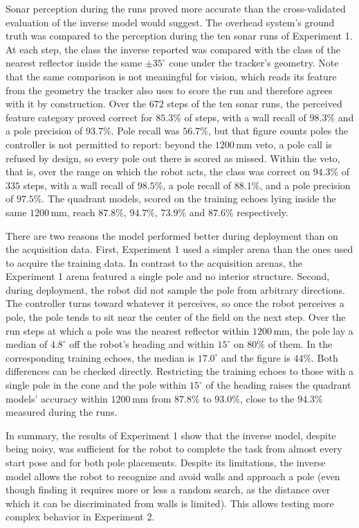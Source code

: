 \documentclass[11pt]{article}
\newcommand{\dgm}{^{\circ}}
\begin{document}
Sonar perception during the runs proved more accurate than the cross-validated evaluation of the inverse model would suggest. The overhead system's ground truth was compared to the perception during the ten sonar runs of Experiment 1. At each step, the class the inverse reported was compared with the class of the nearest reflector inside the same $\pm 35\dgm$ cone under the tracker's geometry. Note that the same comparison is not meaningful for vision, which reads its feature from the geometry the tracker also uses to score the run and therefore agrees with it by construction. Over the $672$ steps of the ten sonar runs, the perceived feature category proved correct for $85.3\%$ of steps, with a wall recall of $98.3\%$ and a pole precision of $93.7\%$. Pole recall was $56.7\%$, but that figure counts poles the controller is not permitted to report: beyond the $1200$\,mm veto, a pole call is refused by design, so every pole out there is scored as missed. Within the veto, that is, over the range on which the robot acts, the class was correct on $94.3\%$ of $335$ steps, with a wall recall of $98.5\%$, a pole recall of $88.1\%$, and a pole precision of $97.5\%$. The quadrant models, scored on the training echoes lying inside the same $1200$\,mm, reach $87.8\%$, $94.7\%$, $73.9\%$ and $87.6\%$ respectively.

There are two reasons the model performed better during deployment than on the acquisition data. First, Experiment 1 used a simpler arena than the ones used to acquire the training data. In contrast to the acquisition arenas, the Experiment 1 arena featured a single pole and no interior structure. Second, during deployment, the robot did not sample the pole from arbitrary directions. The controller turns toward whatever it perceives, so once the robot perceives a pole, the pole tends to sit near the center of the field on the next step. Over the run steps at which a pole was the nearest reflector within $1200$\,mm, the pole lay a median of $4.8^{\circ}$ off the robot's heading and within $15^{\circ}$ on $80\%$ of them. In the corresponding training echoes, the median is $17.0^{\circ}$ and the figure is $44\%$. Both differences can be checked directly. Restricting the training echoes to those with a single pole in the cone and the pole within $15^{\circ}$ of the heading raises the quadrant models' accuracy within $1200$\,mm from $87.8\%$ to $93.0\%$, close to the $94.3\%$ measured during the runs. %

In summary, the results of Experiment 1 show that the inverse model, despite being noisy, was sufficient for the robot to complete the task from almost every start pose and for both pole placements. Despite its limitations, the inverse model allows the robot to recognize and avoid walls and approach a pole (even though finding it requires more or less a random search, as the distance over which it can be discriminated from walls is limited). This allows testing more complex behavior in Experiment 2.
\end{document}
